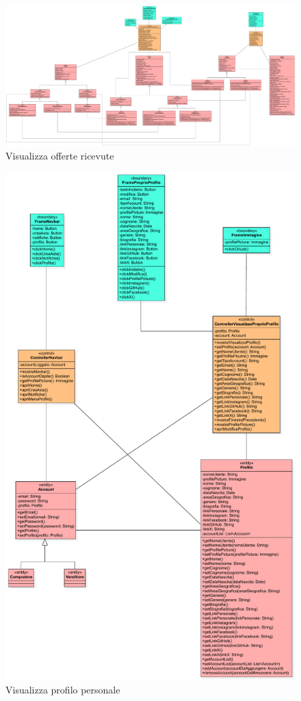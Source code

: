             \begin{figure}[htbp!]
                \centering
                    \includegraphics[width=1\linewidth]{Immagini/Diagrammi/Class Diagram/Utente che ha effettuato l'accesso/VisualizzaOfferteRicevute.pdf}
                \caption{Visualizza offerte ricevute}
            \end{figure}
            
            \begin{figure}[htbp!]
                \centering
                    \includegraphics[width=0.75\linewidth]{Immagini/Diagrammi/Class Diagram/Utente che ha effettuato l'accesso/VisualizzaProprioProfilo.pdf}
                \caption{Visualizza profilo personale}
            \end{figure}
            
